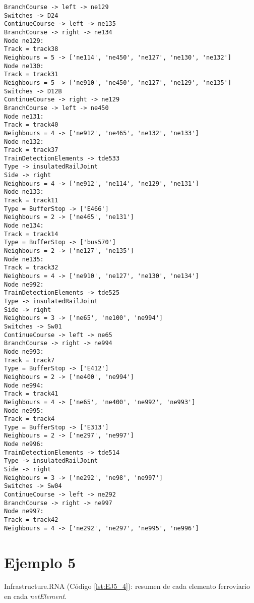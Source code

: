 \begin{lstlisting}[language = {}, tabsize=4, basicstyle=\footnotesize\ttfamily, showspaces=false, showstringspaces=false, caption = Infrastructure.RNA, label = {lst:EJ4_4}]
BranchCourse -> left -> ne129
Switches -> D24
ContinueCourse -> left -> ne135
BranchCourse -> right -> ne134
Node ne129:
Track = track38
Neighbours = 5 -> ['ne114', 'ne450', 'ne127', 'ne130', 'ne132']
Node ne130:
Track = track31
Neighbours = 5 -> ['ne910', 'ne450', 'ne127', 'ne129', 'ne135']
Switches -> D12B
ContinueCourse -> right -> ne129
BranchCourse -> left -> ne450
Node ne131:
Track = track40
Neighbours = 4 -> ['ne912', 'ne465', 'ne132', 'ne133']
Node ne132:
Track = track37
TrainDetectionElements -> tde533
Type -> insulatedRailJoint
Side -> right
Neighbours = 4 -> ['ne912', 'ne114', 'ne129', 'ne131']
Node ne133:
Track = track11
Type = BufferStop -> ['E466']
Neighbours = 2 -> ['ne465', 'ne131']
Node ne134:
Track = track14
Type = BufferStop -> ['bus570']
Neighbours = 2 -> ['ne127', 'ne135']
Node ne135:
Track = track32
Neighbours = 4 -> ['ne910', 'ne127', 'ne130', 'ne134']
Node ne992:
TrainDetectionElements -> tde525
Type -> insulatedRailJoint
Side -> right
Neighbours = 3 -> ['ne65', 'ne100', 'ne994']
Switches -> Sw01
ContinueCourse -> left -> ne65
BranchCourse -> right -> ne994
Node ne993:
Track = track7
Type = BufferStop -> ['E412']
Neighbours = 2 -> ['ne400', 'ne994']
Node ne994:
Track = track41
Neighbours = 4 -> ['ne65', 'ne400', 'ne992', 'ne993']
Node ne995:
Track = track4
Type = BufferStop -> ['E313']
Neighbours = 2 -> ['ne297', 'ne997']
Node ne996:
TrainDetectionElements -> tde514
Type -> insulatedRailJoint
Side -> right
Neighbours = 3 -> ['ne292', 'ne98', 'ne997']
Switches -> Sw04
ContinueCourse -> left -> ne292
BranchCourse -> right -> ne997
Node ne997:
Track = track42
Neighbours = 4 -> ['ne292', 'ne297', 'ne995', 'ne996']
	\end{lstlisting}	
	\section{Ejemplo 5}
	Infrastructure.RNA (Código \ref{lst:EJ5_4}): resumen de cada elemento ferroviario en cada \textit{netElement}.
	
